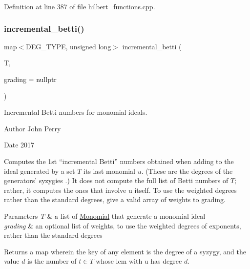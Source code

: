 Definition at line 387 of file hilbert\+\_\+functions.\+cpp.

\mbox{\label{group__commalg_gac808392f45282e90eb6ecfb5c14b5392}} 
\subsubsection{\texorpdfstring{incremental\+\_\+betti()}{incremental\_betti()}\hspace{0.1cm}{\footnotesize\ttfamily [1/2]}}
{\footnotesize\ttfamily map$<$D\+E\+G\+\_\+\+T\+Y\+PE, unsigned long$>$ incremental\+\_\+betti (\begin{DoxyParamCaption}\item[{const list$<$ \hyperlink{group__polygroup_class_monomial}{Monomial} $>$ \&}]{T,  }\item[{const W\+T\+\_\+\+T\+Y\+PE $\ast$}]{grading = {\ttfamily nullptr} }\end{DoxyParamCaption})}



Incremental Betti numbers for monomial ideals. 

\begin{DoxyAuthor}{Author}
John Perry 
\end{DoxyAuthor}
\begin{DoxyDate}{Date}
2017
\end{DoxyDate}
Computes the 1st ``incremental Betti'' numbers obtained when adding to the ideal generated by a set $ T $ its last monomial $ u $. (These are the degrees of the generators' syzygies \cite{KR05}.) It does not compute the full list of Betti numbers of $ T $; rather, it computes the ones that involve {\ttfamily u} itself. To use the weighted degrees rather than the standard degrees, give a valid array of weights to {\ttfamily grading}. 
\begin{DoxyParams}{Parameters}
{\em T} & a list of \hyperlink{group__polygroup_class_monomial}{Monomial} that generate a monomial ideal \\
\hline
{\em grading} & an optional list of weights, to use the weighted degrees of exponents, rather than the standard degrees \\
\hline
\end{DoxyParams}
\begin{DoxyReturn}{Returns}
a map wherein the key of any element is the degree of a syzygy, and the value $ d $ is the number of $ t\in T $ whose lcm with {\ttfamily u} has degree $ d $. 
\end{DoxyReturn}


